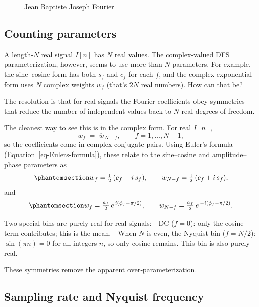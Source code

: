 \documentclass[
  letterpaper,
]{book}
\begin{document}
\begin{tcolorbox}
\begin{figure}[H]
{}

\caption{\label{fig-optics-fourier}Jean Baptiste Joseph Fourier}

\end{figure}%

\end{tcolorbox}

\subsection{Counting parameters}\label{counting-parameters}

A length‑\(N\) real signal \(I[n]\) has \(N\) real values. The
complex-valued DFS parameterization, however, seems to use more than
\(N\) parameters. For example, the sine--cosine form has both \(s_f\)
and \(c_f\) for each \(f\), and the complex exponential form uses \(N\)
complex weights \(w_f\) (that's \(2N\) real numbers). How can that be?

The resolution is that for real signals the Fourier coefficients obey
symmetries that reduce the number of independent values back to \(N\)
real degrees of freedom.

The cleanest way to see this is in the complex form. For real \(I[n]\),
\[
w_{f} \;=\; \overline{w}_{\,N-f}, \qquad f=1,\ldots,N-1,
\] so the coefficients come in complex‑conjugate pairs. Using Euler's
formula (Equation~\ref{eq-Eulers-formula}), these relate to the
sine--cosine and amplitude--phase parameters as
\begin{equation}\phantomsection\label{eq-nyquist-1}{
w_f = \tfrac{1}{2}\,(c_f - i\,s_f), \qquad
w_{N-f} = \tfrac{1}{2}\,(c_f + i\,s_f),
}\end{equation} and \begin{equation}\phantomsection\label{eq-nyquist-2}{
w_f = \tfrac{a_f}{2}\,e^{\,i(\phi_f - \pi/2)}, \qquad
w_{N-f} = \tfrac{a_f}{2}\,e^{\,-i(\phi_f - \pi/2)}.
}\end{equation}

Two special bins are purely real for real signals: - DC (\(f=0\)): only
the cosine term contributes; this is the mean. - When \(N\) is even, the
Nyquist bin (\(f=N/2\)): \(\sin(\pi n)=0\) for all integers \(n\), so
only cosine remains. This bin is also purely real.

These symmetries remove the apparent over‑parameterization.

\subsection{Sampling rate and Nyquist
frequency}\label{sampling-rate-and-nyquist-frequency}
\end{document}
